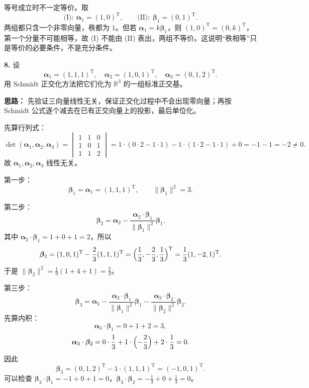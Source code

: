 等号成立时不一定等价。取
\[
\text{(I)}:\ \boldsymbol{\alpha}_1=(1,0)^\mathrm{T},\qquad
\text{(II)}:\ \boldsymbol{\beta}_1=(0,1)^\mathrm{T}.
\]
两组都只含一个非零向量，秩都为 $1$。但若 $\boldsymbol{\alpha}_1=k\boldsymbol{\beta}_1$，则 $(1,0)^\mathrm{T}=(0,k)^\mathrm{T}$，第一个分量不可能相等，故 (I) 不能由 (II) 表出，两组不等价。这说明“秩相等”只是等价的必要条件，不是充分条件。

\else \answerarea[10] \fi%

\textbf{8.} 设
\[
\boldsymbol{\alpha}_1=(1,1,1)^\mathrm{T},\quad
\boldsymbol{\alpha}_2=(1,0,1)^\mathrm{T},\quad
\boldsymbol{\alpha}_3=(0,1,2)^\mathrm{T}.
\]
用 Schmidt 正交化方法把它们化为 $\mathbb{R}^3$ 的一组标准正交基。

\ifshowsolutions%
\quad
\textbf{思路：} 先验证三向量线性无关，保证正交化过程中不会出现零向量；再按 Schmidt 公式逐个减去在已有正交向量上的投影，最后单位化。

先算行列式：
\[
\det(\boldsymbol{\alpha}_1,\boldsymbol{\alpha}_2,\boldsymbol{\alpha}_3)
=\begin{vmatrix}
1&1&0\\
1&0&1\\
1&1&2
\end{vmatrix}
=1\cdot(0\cdot 2-1\cdot 1)-1\cdot(1\cdot 2-1\cdot 1)+0
=-1-1=-2\neq 0.
\]
故 $\boldsymbol{\alpha}_1,\boldsymbol{\alpha}_2,\boldsymbol{\alpha}_3$ 线性无关。

第一步：
\[
\boldsymbol{\beta}_1=\boldsymbol{\alpha}_1=(1,1,1)^\mathrm{T},\qquad
\|\boldsymbol{\beta}_1\|^2=3.
\]

第二步：
\[
\boldsymbol{\beta}_2=\boldsymbol{\alpha}_2-\frac{\boldsymbol{\alpha}_2\cdot\boldsymbol{\beta}_1}{\|\boldsymbol{\beta}_1\|^2}\boldsymbol{\beta}_1.
\]
其中 $\boldsymbol{\alpha}_2\cdot\boldsymbol{\beta}_1=1+0+1=2$，所以
\[
\boldsymbol{\beta}_2=(1,0,1)^\mathrm{T}-\frac{2}{3}(1,1,1)^\mathrm{T}
=\Bigl(\frac13,-\frac23,\frac13\Bigr)^\mathrm{T}
=\frac13(1,-2,1)^\mathrm{T}.
\]
于是 $\|\boldsymbol{\beta}_2\|^2=\frac19(1+4+1)=\frac23$。

第三步：
\[
\boldsymbol{\beta}_3=\boldsymbol{\alpha}_3
-\frac{\boldsymbol{\alpha}_3\cdot\boldsymbol{\beta}_1}{\|\boldsymbol{\beta}_1\|^2}\boldsymbol{\beta}_1
-\frac{\boldsymbol{\alpha}_3\cdot\boldsymbol{\beta}_2}{\|\boldsymbol{\beta}_2\|^2}\boldsymbol{\beta}_2.
\]
先算内积：
\[
\boldsymbol{\alpha}_3\cdot\boldsymbol{\beta}_1=0+1+2=3,
\]
\[
\boldsymbol{\alpha}_3\cdot\boldsymbol{\beta}_2
=0\cdot\frac13+1\cdot\Bigl(-\frac23\Bigr)+2\cdot\frac13=0.
\]
因此
\[
\boldsymbol{\beta}_3=(0,1,2)^\mathrm{T}-1\cdot(1,1,1)^\mathrm{T}=(-1,0,1)^\mathrm{T}.
\]
可以检查 $\boldsymbol{\beta}_3\cdot\boldsymbol{\beta}_1=-1+0+1=0$，$\boldsymbol{\beta}_3\cdot\boldsymbol{\beta}_2=-\frac13+0+\frac13=0$。

